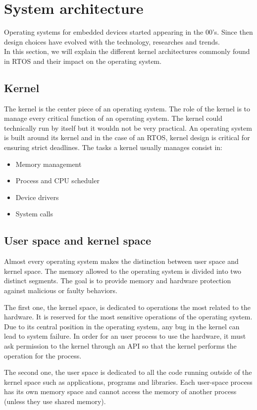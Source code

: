 \section{System architecture}

Operating systems for embedded devices started appearing in the 00's.
Since then design choices have evolved with the technology, researches and trends.
\\
In this section, we will explain the different kernel architectures commonly found in RTOS and their impact on the operating system.

\subsection{Kernel}
The kernel is the center piece of an operating system.
The role of the kernel is to manage every critical function of an operating system.
The kernel could technically run by itself but it wouldn not be very practical.
An operating system is built around its kernel and in the case of an RTOS, kernel design is critical for ensuring strict deadlines.
The tasks a kernel usually manages consist in:
\begin{itemize}
    \item Memory management
    \item Process and CPU scheduler
    \item Device drivers
    \item System calls
\end{itemize}


\subsection{User space and kernel space}
Almost every operating system makes the distinction between user space and kernel space.
The memory allowed to the operating system is divided into two distinct segments.
The goal is to provide memory and hardware protection against malicious or faulty behaviors.

The first one, the kernel space, is dedicated to operations the most related to the hardware.
It is reserved for the most sensitive operations of the operating system.
Due to its central position in the operating system, any bug in the kernel can lead to system failure.
In order for an user process to use the hardware, it must ask permission to the kernel through an API so that the kernel performs the operation for the process.

The second one, the user space is dedicated to all the code running outside of the kernel space such as applications, programs and libraries.
Each user-space process has its own memory space and cannot access the memory of another process (unless they use shared memory).

